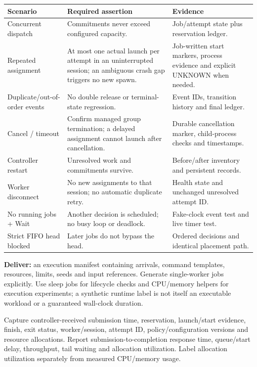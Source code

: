 \documentclass[10pt,letterpaper]{article}
\newcommand{\packet}[2]{\par\vspace{9pt}{\large\bfseries\color{accent}#1}\hspace{6pt}{\large\bfseries #2}\par}
\begin{document}
\begin{tabularx}{\linewidth}{@{}P{1.55in}YY@{}}
\toprule
\textbf{Scenario} & \textbf{Required assertion} & \textbf{Evidence} \\
\midrule
Concurrent dispatch & Commitments never exceed configured capacity. & Job/attempt state plus reservation ledger. \\
Repeated assignment & At most one actual launch per attempt in an uninterrupted session; an ambiguous crash gap triggers no new spawn. & Job-written start markers, process evidence and explicit UNKNOWN when needed. \\
Duplicate/out-of-order events & No double release or terminal-state regression. & Event IDs, transition history and final ledger. \\
Cancel / timeout & Confirm managed group termination; a delayed assignment cannot launch after cancellation. & Durable cancellation marker, child-process checks and timestamps. \\
Controller restart & Unresolved work and commitments survive. & Before/after inventory and persistent records. \\
Worker disconnect & No new assignments to that session; no automatic duplicate retry. & Health state and unchanged unresolved attempt ID. \\
No running jobs + Wait & Another decision is scheduled; no busy loop or deadlock. & Fake-clock event test and live timer test. \\
Strict FIFO head blocked & Later jobs do not bypass the head. & Ordered decisions and identical placement path. \\
\bottomrule
\end{tabularx}

\packet{W6}{Build replay and complete reports}
\textbf{Deliver:} an execution manifest containing arrivals, command templates, resources,
limits, seeds and input references. Generate single-worker jobs explicitly. Use sleep
jobs for lifecycle checks and CPU/memory helpers for execution experiments; a synthetic
runtime label is not itself an executable workload or a guaranteed wall-clock duration.

Capture controller-received submission time, reservation, launch/start evidence, finish,
exit status, worker/session, attempt ID, policy/configuration versions and resource
allocations. Report submission-to-completion response time, queue/start delay,
throughput, tail waiting and allocation utilization. Label allocation utilization
separately from measured CPU/memory usage.
\end{document}
